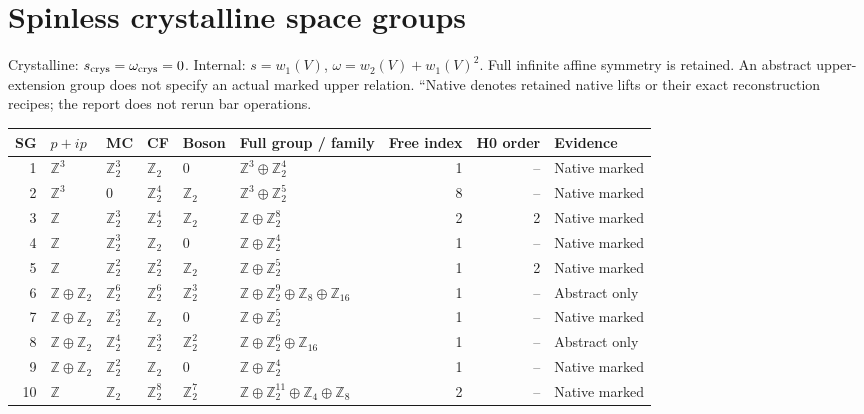 \documentclass[10pt]{article}
\begin{document}
\section*{Spinless crystalline space groups}
Crystalline: $s_{\rm crys}=\omega_{\rm crys}=0$. Internal: $s=w_1(V)$, $\omega=w_2(V)+w_1(V)^2$. Full infinite affine symmetry is retained.
An abstract upper-extension group does not specify an actual marked upper relation. ``Native denotes retained native lifts or their exact reconstruction recipes; the report does not rerun bar operations.
\small\begin{longtable}{r|lllll|rrl}
SG & $p+ip$ & MC & CF & Boson & Full group / family & Free index & H0 order & Evidence\\\hline\endhead
1 & $\mathbb{Z}^{3}$ & $\mathbb{Z}_{2}^{3}$ & $\mathbb{Z}_{2}$ & $0$ & $\mathbb{Z}^{3}\oplus \mathbb{Z}_{2}^{4}$ & 1 & -- & Native marked\\
2 & $\mathbb{Z}^{3}$ & $0$ & $\mathbb{Z}_{2}^{4}$ & $\mathbb{Z}_{2}$ & $\mathbb{Z}^{3}\oplus \mathbb{Z}_{2}^{5}$ & 8 & -- & Native marked\\
3 & $\mathbb{Z}$ & $\mathbb{Z}_{2}^{3}$ & $\mathbb{Z}_{2}^{4}$ & $\mathbb{Z}_{2}$ & $\mathbb{Z}\oplus \mathbb{Z}_{2}^{8}$ & 2 & 2 & Native marked\\
4 & $\mathbb{Z}$ & $\mathbb{Z}_{2}^{3}$ & $\mathbb{Z}_{2}$ & $0$ & $\mathbb{Z}\oplus \mathbb{Z}_{2}^{4}$ & 1 & -- & Native marked\\
5 & $\mathbb{Z}$ & $\mathbb{Z}_{2}^{2}$ & $\mathbb{Z}_{2}^{2}$ & $\mathbb{Z}_{2}$ & $\mathbb{Z}\oplus \mathbb{Z}_{2}^{5}$ & 1 & 2 & Native marked\\
6 & $\mathbb{Z}\oplus \mathbb{Z}_{2}$ & $\mathbb{Z}_{2}^{6}$ & $\mathbb{Z}_{2}^{6}$ & $\mathbb{Z}_{2}^{3}$ & $\mathbb{Z}\oplus \mathbb{Z}_{2}^{9}\oplus \mathbb{Z}_{8}\oplus \mathbb{Z}_{16}$ & 1 & -- & Abstract only\\
7 & $\mathbb{Z}\oplus \mathbb{Z}_{2}$ & $\mathbb{Z}_{2}^{3}$ & $\mathbb{Z}_{2}$ & $0$ & $\mathbb{Z}\oplus \mathbb{Z}_{2}^{5}$ & 1 & -- & Native marked\\
8 & $\mathbb{Z}\oplus \mathbb{Z}_{2}$ & $\mathbb{Z}_{2}^{4}$ & $\mathbb{Z}_{2}^{3}$ & $\mathbb{Z}_{2}^{2}$ & $\mathbb{Z}\oplus \mathbb{Z}_{2}^{6}\oplus \mathbb{Z}_{16}$ & 1 & -- & Abstract only\\
9 & $\mathbb{Z}\oplus \mathbb{Z}_{2}$ & $\mathbb{Z}_{2}^{2}$ & $\mathbb{Z}_{2}$ & $0$ & $\mathbb{Z}\oplus \mathbb{Z}_{2}^{4}$ & 1 & -- & Native marked\\
10 & $\mathbb{Z}$ & $\mathbb{Z}_{2}$ & $\mathbb{Z}_{2}^{8}$ & $\mathbb{Z}_{2}^{7}$ & $\mathbb{Z}\oplus \mathbb{Z}_{2}^{11}\oplus \mathbb{Z}_{4}\oplus \mathbb{Z}_{8}$ & 2 & -- & Native marked\\

\end{longtable}
\end{document}
